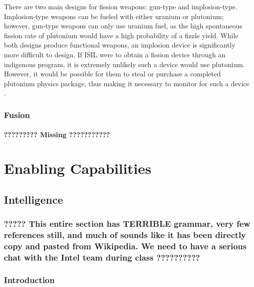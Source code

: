 \documentclass{report}
\begin{document}
There are two main designs for fission weapons:  gun-type and  implosion-type. Implosion-type weapons can be fueled with either uranium or plutonium; however,  gun-type weapons can only use uranium fuel, as the high spontaneous fission rate of  plutonium would have a high probability of a fizzle yield. While both designs produce functional weapons, an implosion device is significantly more difficult to design. If ISIL were to obtain a fission device through an indigenous program, it is extremely unlikely such a device would use plutonium. However, it would be possible for them to steal or purchase a completed plutonium physics package, thus making it necessary to monitor for such a device \cite{Moody2014}.



\subsection{Fusion}

\subsubsection{?????????   Missing   ???????????}






\chapter{Enabling Capabilities }

\section{Intelligence }

\subsection{?????  This entire section has TERRIBLE grammar, very few references still, and much of sounds like it has been directly copy and pasted from Wikipedia. We need to have a serious chat with the Intel team during class   ??????????}


\subsection{Introduction}
\end{document}
